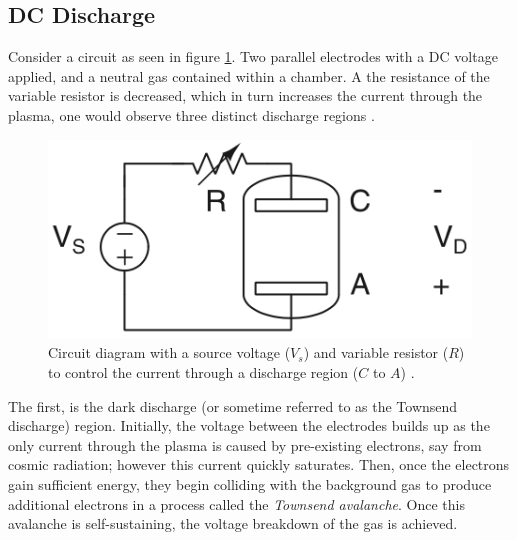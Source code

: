 

\subsection{DC Discharge}

Consider a circuit as seen in figure \ref{fig:basic_circuit}. Two parallel electrodes with a DC voltage applied, and a neutral gas contained within a chamber. A the resistance of the variable resistor is decreased, which in turn increases the current through the plasma, one would observe three distinct discharge regions \cite{Gudmundsson2017}.

\begin{figure}[h!]
	\centering
	\includegraphics[width=0.6\linewidth]{background/figures/basic_circuit.png}
	\caption{Circuit diagram with a source voltage ($V_s$) and variable resistor ($R$) to control the current through a discharge region ($C$ to $A$) \cite{Gudmundsson2017}.}
	\label{fig:basic_circuit}
\end{figure}

The first, is the dark discharge (or sometime referred to as the Townsend discharge) region. Initially, the voltage between the electrodes builds up as the only current through the plasma is caused by pre-existing electrons, say from cosmic radiation; however this current quickly saturates. Then, once the electrons gain sufficient energy, they begin colliding with the background gas to produce additional electrons in a process called the \textit{Townsend avalanche}. Once this avalanche is self-sustaining, the voltage breakdown of the gas is achieved.

